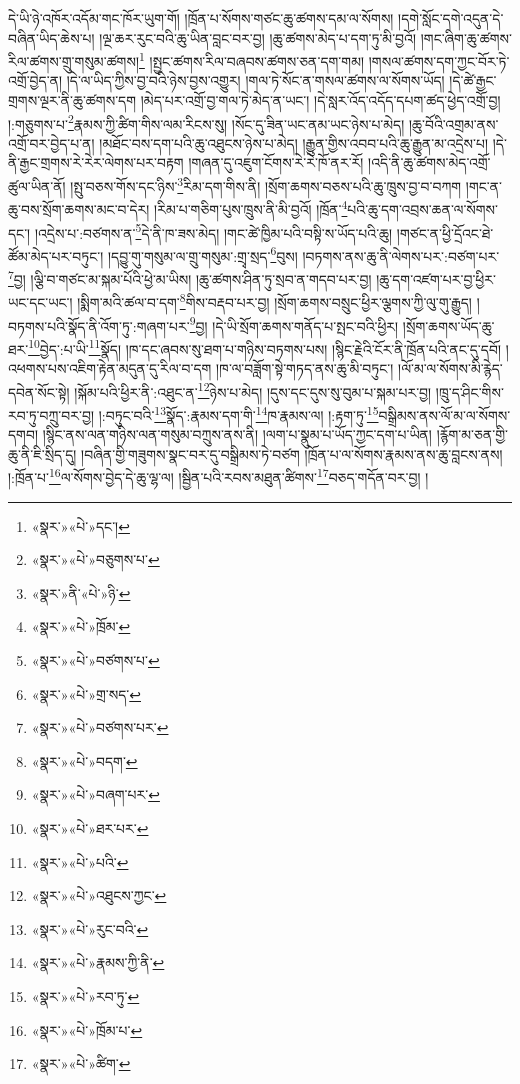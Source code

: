 དེ་ཡི་ཉེ་འཁོར་འདོམ་གང་ཁོར་ཡུག་གོ། །ཁྲོན་པ་སོགས་གཙང་ཆུ་ཚགས་དམ་ལ་སོགས། །དགེ་སློང་དགེ་འདུན་དེ་བཞིན་ཡིད་ཆེས་པ། །ལྔ་ཆར་རུང་བའི་ཆུ་ཡིན་བླང་བར་བྱ། །ཆུ་ཚགས་མེད་པ་དག་ཏུ་མི་བྱའོ། །གང་ཞིག་ཆུ་ཚགས་རིལ་ཚགས་གྲུ་གསུམ་ཚགས།\footnote{«སྣར་»«པེ་»དང་།} །སྤྱང་ཚགས་རིལ་བཞབས་ཚགས་ཅན་དག་གམ། །གསལ་ཚགས་དག་ཀྱང་བོར་ཏེ་འགྲོ་བྱེད་ན། །དེ་ལ་ཡིད་ཀྱིས་བྱ་བའི་ཉེས་བྱས་འགྱུར། །གལ་ཏེ་སོང་ན་གསལ་ཚགས་ལ་སོགས་ཡོད། །དེ་ཚེ་རྒྱང་གྲགས་ལྔར་ནི་ཆུ་ཚགས་དག །མེད་པར་འགྲོ་བྱ་གལ་ཏེ་མེད་ན་ཡང་། །དེ་སླར་འོད་འདོད་དཔག་ཚད་ཕྱེད་འགྲོ་བྱ། །:གཅུགས་པ་\footnote{«སྣར་»«པེ་»བཅུགས་པ་}རྣམས་ཀྱི་ཚིག་གིས་ལམ་རིངས་སུ། །སོང་དུ་ཟིན་ཡང་ནམ་ཡང་ཉེས་པ་མེད། །ཆུ་བོའི་འགྲམ་ནས་འགྲོ་བར་བྱེད་པ་ན། །མཐོང་བས་དག་པའི་ཆུ་འཐུངས་ཉེས་པ་མེད། །རྒྱུན་གྱིས་འབབ་པའི་ཆུ་རྒྱུན་མ་འདྲེས་པ། །དེ་ནི་རྒྱང་གྲགས་རེ་རེར་ལེགས་པར་བརྟག །གཞན་དུ་འཇུག་ངོགས་རེ་རེ་ཁོ་ནར་རོ། །འདི་ནི་ཆུ་ཚགས་མེད་འགྲོ་ཚུལ་ཡིན་ནོ། །སྤུ་བཅས་གོས་དང་ཉིས་\footnote{«སྣར་»ནི་«པེ་»ཉི་}རིམ་དག་གིས་ནི། །སྲོག་ཆགས་བཅས་པའི་ཆུ་ཁྲུས་བྱ་བ་བཀག །གང་ན་ཆུ་བས་སྲོག་ཆགས་མང་བ་དེར། །རིམ་པ་གཅིག་པུས་ཁྲུས་ནི་མི་བྱའོ། །ཁྲོན་\footnote{«སྣར་»«པེ་»ཁྲོམ་}པའི་ཆུ་དག་འབྲས་ཆན་ལ་སོགས་དང་། །འདྲེས་པ་:བཙགས་ན་\footnote{«སྣར་»«པེ་»བཙགས་པ་}དེ་ནི་ཁ་ཟས་མེད། །གང་ཚེ་ཁྱིམ་པའི་བསྟི་ས་ཡོད་པའི་ཆུ། །གཙང་ན་ཕྱི་དྲོའང་ཐེ་ཚོམ་མེད་པར་བཏུང་། །དབྱུ་གུ་གསུམ་ལ་གྲུ་གསུམ་:གྲྭ་སྲད་\footnote{«སྣར་»«པེ་»གྲ་སད་}བུས། །བཏགས་ནས་ཆུ་ནི་ལེགས་པར་:བཙག་པར་\footnote{«སྣར་»«པེ་»བཙགས་པར་}བྱ། །ལྕི་བ་གཙང་མ་སྐམ་པོའི་ཕྱེ་མ་ཡིས། །ཆུ་ཚགས་ཤིན་ཏུ་སྲབ་ན་གདབ་པར་བྱ། །ཆུ་དག་འཛག་པར་བྱ་ཕྱིར་ཡང་དང་ཡང་། །སྨིག་མའི་ཚལ་བ་དག་\footnote{«སྣར་»«པེ་»བདག་}གིས་བརྡབ་པར་བྱ། །སྲོག་ཆགས་བསྲུང་ཕྱིར་ལྕགས་ཀྱི་ལུ་གུ་རྒྱུད། །བཏགས་པའི་སྣོད་ནི་འོག་ཏུ་:གཞག་པར་\footnote{«སྣར་»«པེ་»བཞག་པར་}བྱ། །དེ་ཡི་སྲོག་ཆགས་གནོད་པ་སྤང་བའི་ཕྱིར། །སྲོག་ཆགས་ཡོད་ཆུ་ཐར་\footnote{«སྣར་»«པེ་»ཐར་པར་}བྱེད་:པ་ཡི་\footnote{«སྣར་»«པེ་»པའི་}སྣོད། །ཁ་དང་ཞབས་སུ་ཐག་པ་གཉིས་བཏགས་པས། །སྙིང་རྗེའི་ངོར་ནི་ཁྲོན་པའི་ནང་དུ་དབོ། །འཕགས་པས་འཇིག་རྟེན་མདུན་དུ་རིལ་བ་དག །ཁ་ལ་བཟློག་སྟེ་གཏད་ནས་ཆུ་མི་བཏུང་། །ལོ་མ་ལ་སོགས་མི་རྙེད་དབེན་སོང་སྟེ། །སྐོམ་པའི་ཕྱིར་ནི་:འཐུང་ན་\footnote{«སྣར་»«པེ་»འཐུངས་ཀྱང་}ཉེས་པ་མེད། །དུས་དང་དུས་སུ་བུམ་པ་སྐམ་པར་བྱ། །ཁྲུ་ད་ཤིང་གིས་རབ་ཏུ་བཀྲུ་བར་བྱ། །:བཏུང་བའི་\footnote{«སྣར་»«པེ་»རུང་བའི་}སྣོད་:རྣམས་དག་གི་\footnote{«སྣར་»«པེ་»རྣམས་ཀྱི་ནི་}ཁ་རྣམས་ལ། །:རྟག་ཏུ་\footnote{«སྣར་»«པེ་»རབ་ཏུ་}བསྒྲིམས་ནས་ལོ་མ་ལ་སོགས་དགབ། །སྙིང་ནས་ལན་གཉིས་ལན་གསུམ་བཀྲུས་ནས་ནི། །ལག་པ་སྣུམ་པ་ཡོད་ཀྱང་དག་པ་ཡིན། །རྙོག་མ་ཅན་གྱི་ཆུ་ནི་ཇི་སྲིད་དུ། །བཞིན་གྱི་གཟུགས་སྣང་བར་དུ་བསྒྲིམས་ཏེ་བཙག །ཁྲོན་པ་ལ་སོགས་རྣམས་ནས་ཆུ་བླངས་ནས། །:ཁྲོན་པ་\footnote{«སྣར་»«པེ་»ཁྲོམ་པ་}ལ་སོགས་བྱེད་དེ་ཆུ་ལྷ་ལ། །སྦྱིན་པའི་རབས་མཐུན་ཚིགས་\footnote{«སྣར་»«པེ་»ཚིག་}བཅད་གདོན་བར་བྱ། །

